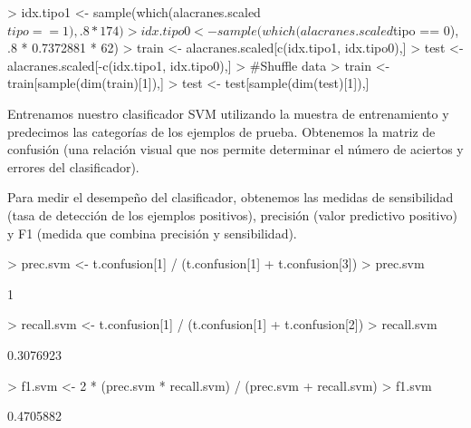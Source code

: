 \documentclass{article}
\begin{document}
\begin{Schunk}
\begin{Sinput}
> idx.tipo1 <- sample(which(alacranes.scaled$tipo == 1), .8 * 174)
> idx.tipo0 <- sample(which(alacranes.scaled$tipo == 0), .8 * 0.7372881 * 62)
> train <- alacranes.scaled[c(idx.tipo1, idx.tipo0),]
> test <- alacranes.scaled[-c(idx.tipo1, idx.tipo0),]
> #Shuffle data
> train <- train[sample(dim(train)[1]),]
> test <- test[sample(dim(test)[1]),]
\end{Sinput}
\end{Schunk}

Entrenamos nuestro clasificador SVM utilizando la muestra de entrenamiento y predecimos las categorías de los ejemplos de prueba. Obtenemos la matriz de confusión (una relación visual que nos permite determinar el número de aciertos y errores del clasificador).
\begin{Schunk}
\end{Schunk}

Para medir el desempeño del clasificador, obtenemos las medidas de sensibilidad (tasa de detección de los ejemplos positivos), precisión (valor predictivo positivo) y F1 (medida que combina precisión y sensibilidad).
\begin{Schunk}
\begin{Sinput}
> prec.svm <- t.confusion[1] / (t.confusion[1] + t.confusion[3])
> prec.svm
\end{Sinput}
\begin{Soutput}
[1] 1
\end{Soutput}
\begin{Sinput}
> recall.svm <- t.confusion[1] / (t.confusion[1] + t.confusion[2])
> recall.svm
\end{Sinput}
\begin{Soutput}
[1] 0.3076923
\end{Soutput}
\begin{Sinput}
> f1.svm <- 2 * (prec.svm * recall.svm) / (prec.svm + recall.svm)
> f1.svm
\end{Sinput}
\begin{Soutput}
[1] 0.4705882
\end{Soutput}
\end{Schunk}
\end{document}
